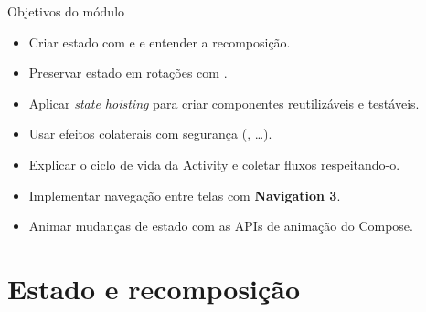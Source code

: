 \documentclass[aspectratio=169,10pt]{beamer}
\begin{document}
\capa

\begin{frame}{Objetivos do módulo}
  \begin{conceito}
    \begin{itemize}
      \item Criar estado com  e  e entender a recomposição.
      \item Preservar estado em rotações com .
      \item Aplicar \emph{state hoisting} para criar componentes reutilizáveis e testáveis.
      \item Usar efeitos colaterais com segurança (, \ldots).
      \item Explicar o ciclo de vida da Activity e coletar fluxos respeitando-o.
      \item Implementar navegação entre telas com \textbf{Navigation 3}.
      \item Animar mudanças de estado com as APIs de animação do Compose.
    \end{itemize}
  \end{conceito}
\end{frame}

\sumario



\section{Estado e recomposição}
\end{document}
